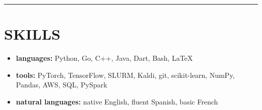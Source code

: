 \documentclass[11pt,letterpaper]{article}
\newcommand*{\cvsection}[1]{
  \vspace{2mm}
  \hrule
  \vspace*{-0.6em}
  \section*{#1}
  \vspace*{-0.4em}
}
\begin{document}
\cvsection{SKILLS}

\begin{minipage}{\linewidth}
  \small\begin{multicols}{2}
    \begin{itemize}
      \setlength\itemsep{0ex}
      \item \textbf{languages:} Python, Go, C++, Java, Dart, Bash, \LaTeX{}
      \item \textbf{tools:} PyTorch, TensorFlow, SLURM, Kaldi, git, scikit-learn, NumPy, Pandas, AWS, SQL, PySpark
      \item \textbf{natural languages:} native English, fluent Spanish, basic French
    \end{itemize}
  \end{multicols}
\end{minipage}
\end{document}
